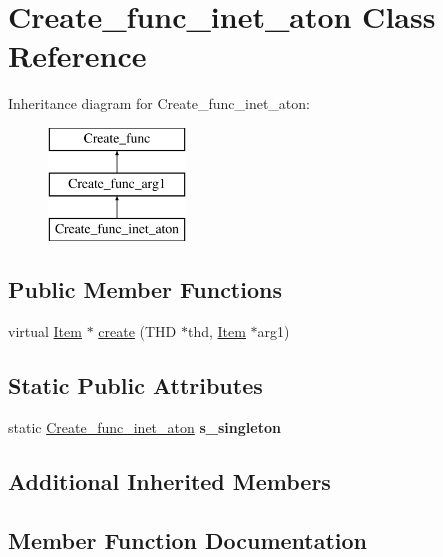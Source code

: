 \hypertarget{classCreate__func__inet__aton}{}\section{Create\+\_\+func\+\_\+inet\+\_\+aton Class Reference}
\label{classCreate__func__inet__aton}
Inheritance diagram for Create\+\_\+func\+\_\+inet\+\_\+aton\+:\begin{figure}[H]
\begin{center}
\leavevmode
\includegraphics[height=3.000000cm]{classCreate__func__inet__aton}
\end{center}
\end{figure}
\subsection*{Public Member Functions}
\begin{DoxyCompactItemize}
\item 
virtual \mbox{\hyperlink{classItem}{Item}} $\ast$ \mbox{\hyperlink{classCreate__func__inet__aton_a26670f580acf39800bacd3232ec18019}{create}} (T\+HD $\ast$thd, \mbox{\hyperlink{classItem}{Item}} $\ast$arg1)
\end{DoxyCompactItemize}
\subsection*{Static Public Attributes}
\begin{DoxyCompactItemize}
\item 
\mbox{\label{classCreate__func__inet__aton_af37d7f07a51c3d16cd56f6d6ab9b86dd}} 
static \mbox{\hyperlink{classCreate__func__inet__aton}{Create\+\_\+func\+\_\+inet\+\_\+aton}} {\bfseries s\+\_\+singleton}
\end{DoxyCompactItemize}
\subsection*{Additional Inherited Members}


\subsection{Member Function Documentation}
\mbox{\label{classCreate__func__inet__aton_a26670f580acf39800bacd3232ec18019}} 
